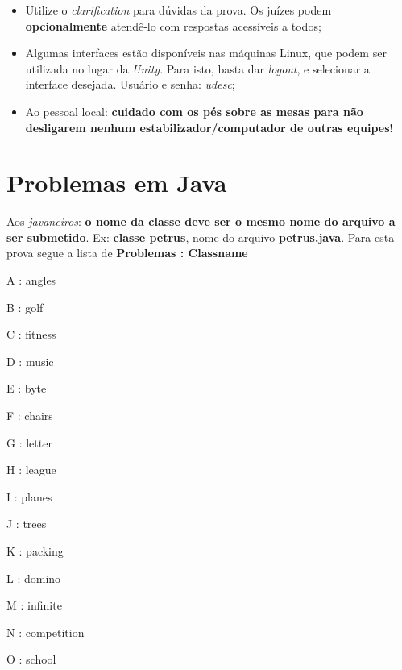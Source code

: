 \documentclass[12pt,oneside]{article}
\begin{document}
\begin{small}
\begin{itemize}
 \item Utilize o \emph{clarification} para dúvidas da prova. Os juízes podem \textbf{opcionalmente} atendê-lo com respostas acessíveis a todos;
 
 \item Algumas interfaces estão disponíveis nas máquinas Linux, que podem ser utilizada
no lugar da \textit{Unity}. Para isto, basta dar \textit{logout}, e 
 selecionar a interface desejada. Usuário e senha: \textit{udesc};

\item Ao pessoal local: \textbf{cuidado com os pés sobre as mesas
para não desligarem nenhum estabilizador/computador de outras equipes}!


\end{itemize}
\end{small}



\clearpage

\pagestyle{fancy}
\renewcommand{\footrulewidth}{0.7pt}
\renewcommand{\headrulewidth}{0.7pt}
\chead{}
\cfoot{\thepage}


\section{Problemas em Java}

Aos {\em javaneiros}: {\bf o nome da classe deve ser o mesmo nome do arquivo a ser submetido}. 
    Ex: {\bf classe petrus}, nome do arquivo {\bf petrus.java}.
    Para esta prova segue a lista de {\bf Problemas : Classname}

{\bf 
\begin{description}
\itemsep -3pt
\item A : angles
\item B : golf
\item C : fitness
\item D : music
\item E : byte
\item F : chairs
\item G : letter
\item H : league
\item I : planes
\item J : trees
\item K : packing
\item L : domino
\item M : infinite
\item N : competition
\item O : school

\end{description}
}
\end{document}
